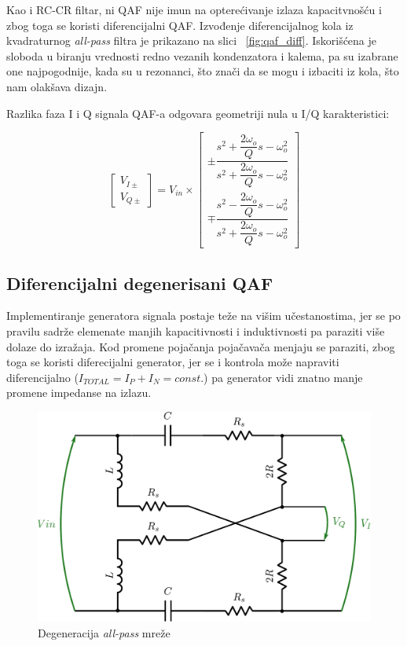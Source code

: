 \documentclass[journal,twocolumn,letterpaper]{IEEEJERM}
\begin{document}
Kao i RC-CR filtar, ni QAF nije imun na opterećivanje izlaza kapacitvnošću i zbog toga se koristi diferencijalni QAF. Izvođenje diferencijalnog kola iz kvadraturnog \textit{all-pass} filtra je prikazano na slici ~\ref{fig:qaf_diff}. Iskorišćena je sloboda u biranju vrednosti redno vezanih kondenzatora i kalema, pa su izabrane one najpogodnije, kada su u rezonanci, što znači da se mogu i izbaciti iz kola, što nam olakšava dizajn.

Razlika faza I i Q signala QAF-a odgovara geometriji nula u I/Q karakteristici:


\[
\begin{bmatrix}
    V_{I\pm}      \\
    V_{Q\pm}    
\end{bmatrix}   
=
V_{in} \times
\begin{bmatrix}
    \pm \dfrac{s^2 + \dfrac{2 \omega_{o}}{Q} s - \omega_{o}^2}{s^2 + \dfrac{2\omega_{o}}{Q} s - \omega_{o}^2} \\
    \mp \dfrac{s^2 - \dfrac{2 \omega_{o}}{Q} s - \omega_{o}^2}{s^2 + \dfrac{2\omega_{o}}{Q} s - \omega_{o}^2}
\end{bmatrix}
\]

\subsection{Diferencijalni degenerisani QAF}

Implementiranje generatora signala postaje teže na višim učestanostima, jer se po pravilu sadrže elemenate manjih kapacitivnosti i induktivnosti pa paraziti više dolaze do izražaja. Kod promene pojačanja pojačavača menjaju se paraziti, zbog toga se koristi diferecijalni generator, jer se i kontrola može napraviti diferencijalno ($I_{TOTAL}=I_{P}+I_{N}=const.$) pa generator vidi znatno manje promene impedanse na izlazu.

\begin{figure}[!htbp]
  \centering
  \includegraphics[width=\linewidth]{qaf_diff_degen.pdf}
  \caption{Degeneracija \textit{all-pass} mreže}
  \label{fig:qaf_diff_degen}
\end{figure}
\end{document}
